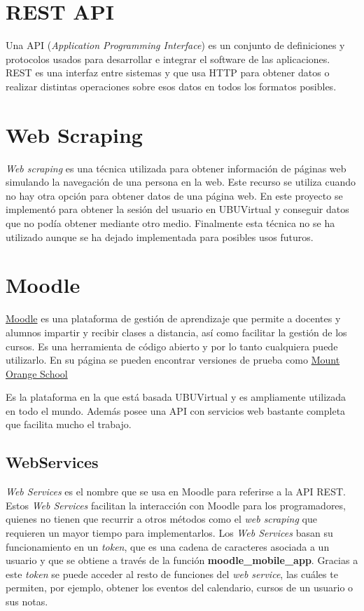 
\section{REST API}

Una API \cite{QueEsAPI}(\textit{Application Programming Interface}) es un conjunto de definiciones y protocolos usados para desarrollar e integrar el software de las aplicaciones. REST \cite{APIRESTQue} es una interfaz entre sistemas y que usa HTTP para obtener datos o realizar distintas operaciones sobre esos datos en todos los formatos posibles.

\section{Web Scraping}

\textit{Web scraping}\cite{QueEsWeb2019} es una técnica utilizada para obtener información de páginas web simulando la navegación de una persona en la web. Este recurso se utiliza cuando no hay otra opción para obtener datos de una página web. En este proyecto se implementó para obtener la sesión del usuario en UBUVirtual y conseguir datos que no podía obtener mediante otro medio. Finalmente esta técnica no se ha utilizado aunque se ha dejado implementada para posibles usos futuros.

\section{Moodle}

\href{https://moodle.org/}{Moodle}\cite{Moodle2020} es una plataforma de gestión de aprendizaje que permite a docentes y alumnos impartir y recibir clases a distancia, así como facilitar la gestión de los cursos. Es una herramienta de código abierto y por lo tanto cualquiera puede utilizarlo. En su página se pueden encontrar versiones de prueba como \href{https://school.moodledemo.net/}{Mount Orange School}

Es la plataforma en la que está basada UBUVirtual y es ampliamente utilizada en todo el mundo. Además posee una API con servicios web bastante completa que facilita mucho el trabajo.

\subsection{WebServices}

\textit{Web Services} es el nombre que se usa en Moodle para referirse a la API REST. Estos \textit{Web Services} facilitan la interacción con Moodle para los programadores, quienes no tienen que recurrir a otros métodos como el \textit{web scraping} que requieren un mayor tiempo para implementarlos. Los \textit{Web Services} basan su funcionamiento en un \textit{token}, que es una cadena de caracteres asociada a un usuario y que se obtiene a través de la función \textbf{moodle\_mobile\_app}. Gracias a este \textit{token} se puede acceder al resto de funciones del \textit{web service}, las cuáles te permiten, por ejemplo, obtener los eventos del calendario, cursos de un usuario o sus notas.

